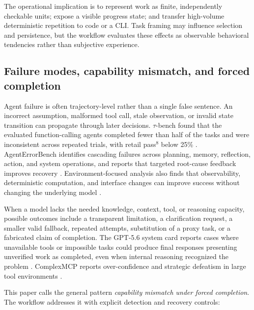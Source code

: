 \documentclass[11pt,a4paper]{article}
\begin{document}
The operational implication is to represent work as finite, independently checkable units; expose a visible progress state; and transfer high-volume deterministic repetition to code or a CLI. Task framing may influence selection and persistence, but the workflow evaluates these effects as observable behavioral tendencies rather than subjective experience.

\subsection{Failure modes, capability mismatch, and forced completion}\label{sec:failure-modes}

Agent failure is often trajectory-level rather than a single false sentence. An incorrect assumption, malformed tool call, stale observation, or invalid state transition can propagate through later decisions. $\tau$-bench found that the evaluated function-calling agents completed fewer than half of the tasks and were inconsistent across repeated trials, with retail pass$^8$ below 25\% \cite{yao2024taubench}. AgentErrorBench identifies cascading failures across planning, memory, reflection, action, and system operations, and reports that targeted root-cause feedback improves recovery \cite{zhu2025agenterrors}. Environment-focused analysis also finds that observability, deterministic computation, and interface changes can improve success without changing the underlying model \cite{song2025aegis}.

When a model lacks the needed knowledge, context, tool, or reasoning capacity, possible outcomes include a transparent limitation, a clarification request, a smaller valid fallback, repeated attempts, substitution of a proxy task, or a fabricated claim of completion. The GPT-5.6 system card reports cases where unavailable tools or impossible tasks could produce final responses presenting unverified work as completed, even when internal reasoning recognized the problem \cite{openai56card2026}. ComplexMCP reports over-confidence and strategic defeatism in large tool environments \cite{li2026complexmcp}.

This paper calls the general pattern \emph{capability mismatch under forced completion}. The workflow addresses it with explicit detection and recovery controls:
\end{document}
